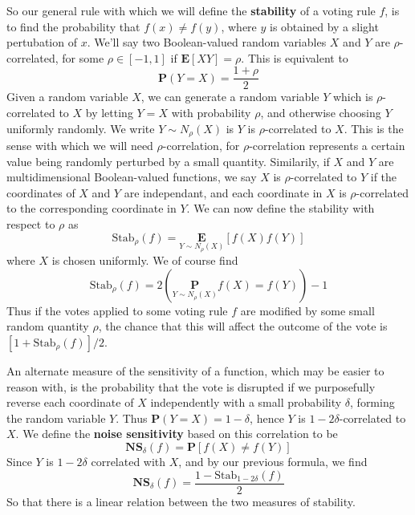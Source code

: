 So our general rule with which we will define the {\bf stability} of a voting rule $f$, is to find the probability that $f(x) \neq f(y)$, where $y$ is obtained by a slight pertubation of $x$. We'll say two Boolean-valued random variables $X$ and $Y$ are $\rho$-correlated, for some $\rho \in [-1,1]$ if $\mathbf{E}[XY] = \rho$. This is equivalent to
%
\[ \mathbf{P}(Y = X) = \frac{1 + \rho}{2} \]
%
Given a random variable $X$, we can generate a random variable $Y$ which is $\rho$-correlated to $X$ by letting $Y = X$ with probability $\rho$, and otherwise choosing $Y$ uniformly randomly. We write $Y \sim N_\rho(X)$ is $Y$ is $\rho$-correlated to $X$. This is the sense with which we will need $\rho$-correlation, for $\rho$-correlation represents a certain value being randomly perturbed by a small quantity. Similarily, if $X$ and $Y$ are multidimensional Boolean-valued functions, we say $X$ is $\rho$-correlated to $Y$ if the coordinates of $X$ and $Y$ are independant, and each coordinate in $X$ is $\rho$-correlated to the corresponding coordinate in $Y$. We can now define the stability with respect to $\rho$ as
%
\[ \text{Stab}_\rho(f) = \underset{Y \sim N_\rho(X)}{\mathbf{E}}[f(X)f(Y)] \]
%
where $X$ is chosen uniformly. We of course find
%
\[\text{Stab}_\rho(f) = 2 \left( \underset{Y \sim N_\rho(X)}{\mathbf{P}} f(X) = f(Y)  \right) - 1 \]
%
Thus if the votes applied to some voting rule $f$ are modified by some small random quantity $\rho$, the chance that this will affect the outcome of the vote is $[1 + \text{Stab}_\rho(f)]/2$.

An alternate measure of the sensitivity of a function, which may be easier to reason with, is the probability that the vote is disrupted if we purposefully reverse each coordinate of $X$ independently with a small probability $\delta$, forming the random variable $Y$. Thus $\mathbf{P}(Y = X) = 1 - \delta$, hence $Y$ is $1 - 2\delta$-correlated to $X$. We define the {\bf noise sensitivity} based on this correlation to be
%
\[ \mathbf{NS}_\delta(f) = \mathbf{P}[ f(X) \neq f(Y) ]\]
%
Since $Y$ is $1 - 2\delta$ correlated with $X$, and by our previous formula, we find
%
\[ \mathbf{NS}_\delta(f) = \frac{1 - \text{Stab}_{1 - 2\delta}(f)}{2} \]
%
So that there is a linear relation between the two measures of stability.

